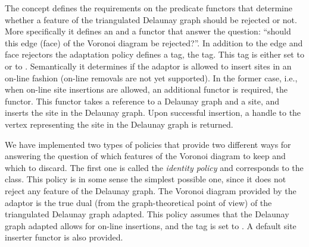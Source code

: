 The concept  defines the requirements on
the predicate functors that determine whether a feature of the
triangulated Delaunay graph should be rejected or not. More
specifically it defines an  and a
 functor that answer the question: ``should this
edge (face) of the Voronoi diagram be rejected?''. In addition to the
edge and face rejectors the adaptation policy defines a tag, the
 tag. This tag is either set to 
or to . Semantically it determines if the adaptor
is allowed to insert sites in an on-line fashion (on-line removals are
not yet supported). In the former case, i.e., when on-line site
insertions are allowed, an additional functor is required, the
 functor. This functor takes a reference to a
Delaunay graph and a site, and inserts the site in the Delaunay
graph. Upon successful insertion, a handle to the vertex representing
the site in the Delaunay graph is returned.

We have implemented two types of policies that provide two different
ways for answering the question of which features of the Voronoi
diagram to keep and which to discard. The first one is called the
\emph{identity policy} and corresponds to the
 class. This policy is in some sense the
simplest possible one, since it does not reject any feature of the
Delaunay graph. The Voronoi diagram provided by the adaptor is the
true dual (from the graph-theoretical point of view) of the
triangulated Delaunay graph adapted. This policy assumes that the
Delaunay graph adapted allows for on-line insertions, and the
 tag is set to . A default site
inserter functor is also provided.


